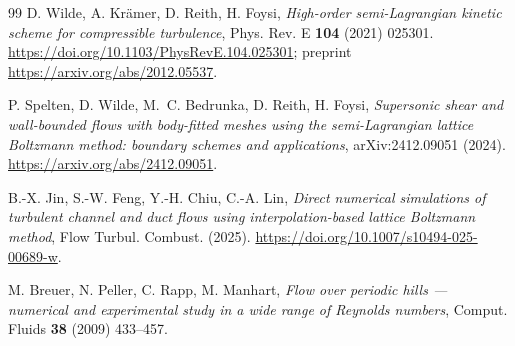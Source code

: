 \documentclass[11pt,a4paper]{article}
\begin{document}
\begin{thebibliography}{99}
D. Wilde, A. Kr\"amer, D. Reith, H. Foysi,
\emph{High-order semi-Lagrangian kinetic scheme for compressible turbulence},
Phys. Rev. E \textbf{104} (2021) 025301.
\url{https://doi.org/10.1103/PhysRevE.104.025301};
preprint \url{https://arxiv.org/abs/2012.05537}.

P. Spelten, D. Wilde, M.~C. Bedrunka, D. Reith, H. Foysi,
\emph{Supersonic shear and wall-bounded flows with body-fitted meshes using the
semi-Lagrangian lattice Boltzmann method: boundary schemes and applications},
arXiv:2412.09051 (2024).
\url{https://arxiv.org/abs/2412.09051}.

B.-X. Jin, S.-W. Feng, Y.-H. Chiu, C.-A. Lin,
\emph{Direct numerical simulations of turbulent channel and duct flows using
interpolation-based lattice Boltzmann method},
Flow Turbul. Combust. (2025).
\url{https://doi.org/10.1007/s10494-025-00689-w}.

M. Breuer, N. Peller, C. Rapp, M. Manhart,
\emph{Flow over periodic hills --- numerical and experimental study in a wide range of
Reynolds numbers}, Comput. Fluids \textbf{38} (2009) 433--457.

\end{thebibliography}
\end{document}
